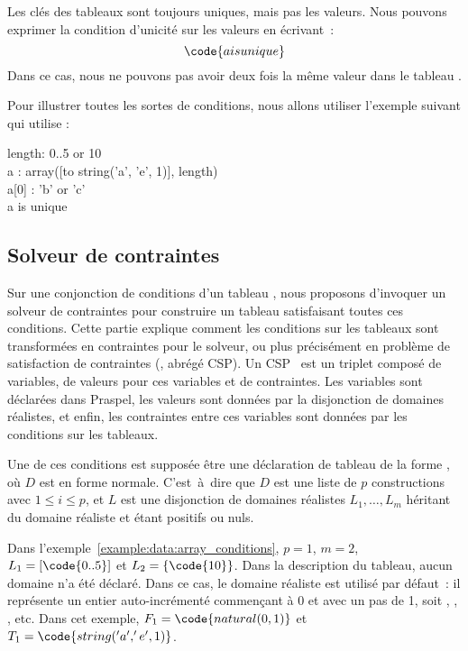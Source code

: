 Les clés des tableaux sont toujours uniques, mais pas les valeurs. Nous pouvons
exprimer la condition d'unicité sur les valeurs en écrivant~:
%
$$\code{a is unique}$$
%
Dans ce cas, nous ne pouvons pas avoir deux fois la même valeur dans le tableau
.

\begin{example}
\label{example:data:array_conditions}
Pour illustrer toutes les sortes de conditions, nous allons utiliser l'exemple
suivant qui utilise :

\begin{pre}
length: 0..5 or 10 \\
a     : array([to string('a', 'e', 1)], length) \\
a[0]  : 'b' or 'c' \\
a is unique
\end{pre}

\end{example}

\subsection{Solveur de contraintes}

Sur une conjonction de conditions d'un tableau , nous proposons
d'invoquer un solveur de contraintes pour construire un tableau satisfaisant
toutes ces conditions. Cette partie explique comment les conditions sur les
tableaux sont transformées en contraintes pour le solveur, ou plus précisément
en problème de satisfaction de contraintes (, abrégé CSP). Un CSP~ est un triplet composé de
variables, de valeurs pour ces variables et de contraintes. Les variables sont
déclarées dans Praspel, les valeurs sont données par la disjonction de domaines
réalistes, et enfin, les contraintes entre ces variables sont données par les
conditions sur les tableaux.

Une de ces conditions est supposée être une déclaration de tableau de la forme
, où $D$ est en forme normale. C'est~à~dire que $D$ est
une liste de $p$ constructions  avec $1 \leq i \leq
p$, et $L$ est une disjonction de domaines réalistes $L_1, \dots, L_m$ héritant
du domaine réaliste  et étant positifs ou nuls.

Dans l'exemple~\ref{example:data:array_conditions}, $p = 1$, $m = 2$, $L_1 =
[\code{0..5}]$ et $L_2 = \{\code{10}\}$. Dans la description du tableau, aucun
domaine n'a été déclaré. Dans ce cas, le domaine réaliste 
est utilisé par défaut~: il représente un entier auto-incrémenté commençant à 0
et avec un pas de 1, soit , , ,  etc. Dans cet
exemple, $F_1 = \code{natural(0, 1)}$ et $T_1 = \code{string('a', 'e', 1)}$.

